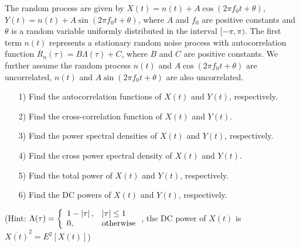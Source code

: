 \documentclass{assignment}
\begin{document}
\begin{prob}
    The random process are given by $X(t)=n(t)+A\cos(2\pi f_0t+\theta)$, $Y(t)=n(t)+A\sin(2\pi f_0t+\theta)$, where $A$ and $f_0$ are positive constants and $\theta$ is a random variable uniformly distributed in the interval $[-\pi,\pi)$. The first term $n(t)$ represents a stationary random noise process with autocorrelation function $R_n(\tau)=B\Lambda(\tau)+C$, where $B$ and $C$ are positive constants. We further assume the random process $n(t)$ and $A\cos(2\pi f_0t+\theta)$ are uncorrelated, $n(t)$ and $A\sin(2\pi f_0t+\theta)$ are also uncorrelated.
    \begin{itemize}
        \item[1)] Find the autocorrelation functions of $X(t)$ and $Y(t)$, respectively.
        \item[2)] Find the cross-correlation function of $X(t)$ and $Y(t)$.
        \item[3)] Find the power spectral densities of $X(t)$ and $Y(t)$, respectively.
        \item[4)] Find the cross power spectral density of $X(t)$ and $Y(t)$.
        \item[5)] Find the total power of $X(t)$ and $Y(t)$, respectively.
        \item[6)] Find the DC powers of $X(t)$ and $Y(t)$, respectively.
    \end{itemize}
    (Hint: $\Lambda(\tau)=\left\{\begin{array}{ll}
        1-\left\lvert\tau\right\rvert,&\left\lvert\tau\right\rvert\leq 1\\
        0,&\text{otherwise}
    \end{array}\right.$, the DC power of $X(t)$ is $\overline{X(t)}^2=E^2[X(t)]$)
\end{prob}
\end{document}
